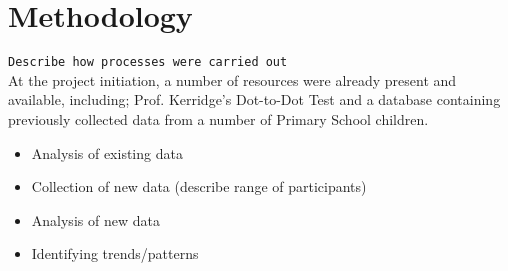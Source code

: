 \section{Methodology}
	\texttt{Describe how processes were carried out}\\
	At the project initiation, a number of resources were already present and available, including; Prof. Kerridge's Dot-to-Dot Test and a database containing previously collected data from a number of Primary School children.
	\begin{itemize}
		\item Analysis of existing data
		\item Collection of new data (describe range of participants)
		\item Analysis of new data
		\item Identifying trends/patterns
	\end{itemize}

\newpage